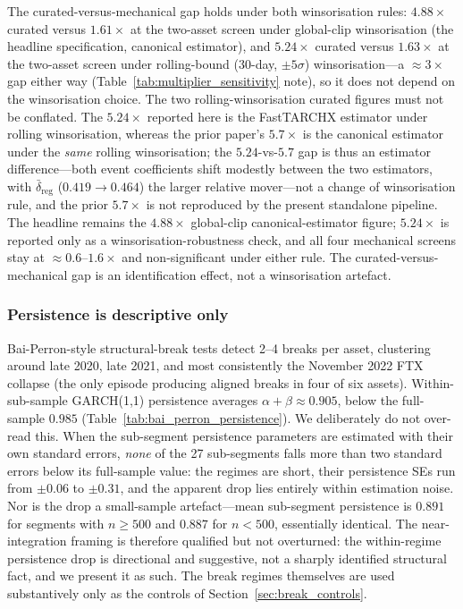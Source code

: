\documentclass[pdflatex,sn-mathphys-num]{sn-jnl}
\theoremstyle{thmstyleone}
\theoremstyle{thmstyletwo}
\theoremstyle{thmstylethree}
\begin{document}
The curated-versus-mechanical gap holds under both winsorisation rules: $4.88\times$ curated versus $1.61\times$ at the two-asset screen under global-clip winsorisation (the headline specification, canonical estimator), and $5.24\times$ curated versus $1.63\times$ at the two-asset screen under rolling-bound ($30$-day, $\pm 5\sigma$) winsorisation---a $\approx 3\times$ gap either way (Table~\ref{tab:multiplier_sensitivity} note), so it does not depend on the winsorisation choice. The two rolling-winsorisation curated figures must not be conflated. The $5.24\times$ reported here is the FastTARCHX estimator under rolling winsorisation, whereas the prior paper's $5.7\times$ is the canonical estimator under the \emph{same} rolling winsorisation; the $5.24$-vs-$5.7$ gap is thus an estimator difference---both event coefficients shift modestly between the two estimators, with $\bar\delta_{\text{reg}}$ ($0.419\to0.464$) the larger relative mover---not a change of winsorisation rule, and the prior $5.7\times$ is not reproduced by the present standalone pipeline. The headline remains the $4.88\times$ global-clip canonical-estimator figure; $5.24\times$ is reported only as a winsorisation-robustness check, and all four mechanical screens stay at $\approx 0.6$--$1.6\times$ and non-significant under either rule. The curated-versus-mechanical gap is an identification effect, not a winsorisation artefact.

\subsubsection{Persistence is descriptive only}\label{sec:persistence}

Bai-Perron-style structural-break tests \citep{BaiPerron1998, BaiPerron2003, KillickFearnheadEckley2012} detect 2--4 breaks per asset, clustering around late 2020, late 2021, and most consistently the November 2022 FTX collapse (the only episode producing aligned breaks in four of six assets). Within-sub-sample GARCH(1,1) persistence averages $\alpha+\beta\approx 0.905$, below the full-sample $0.985$ (Table~\ref{tab:bai_perron_persistence}). We deliberately do not over-read this. When the sub-segment persistence parameters are estimated with their own standard errors, \emph{none} of the 27 sub-segments falls more than two standard errors below its full-sample value: the regimes are short, their persistence SEs run from $\pm 0.06$ to $\pm 0.31$, and the apparent drop lies entirely within estimation noise. Nor is the drop a small-sample artefact---mean sub-segment persistence is $0.891$ for segments with $n\geq 500$ and $0.887$ for $n<500$, essentially identical. The near-integration framing is therefore qualified but not overturned: the within-regime persistence drop is directional and suggestive, not a sharply identified structural fact, and we present it as such. The break regimes themselves are used substantively only as the controls of Section~\ref{sec:break_controls}.
\end{document}
